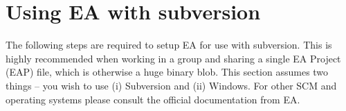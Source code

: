 \newpage

\section{Using EA with subversion}
\visHeader

The following steps are required to setup EA for use with subversion. This is highly recommended when working in a group and sharing a single EA Project (EAP)
file, which is otherwise a huge binary blob. This section assumes two things -- you wish to use (i) Subversion and (ii) Windows. For other SCM
and operating systems please consult the official documentation from EA.








